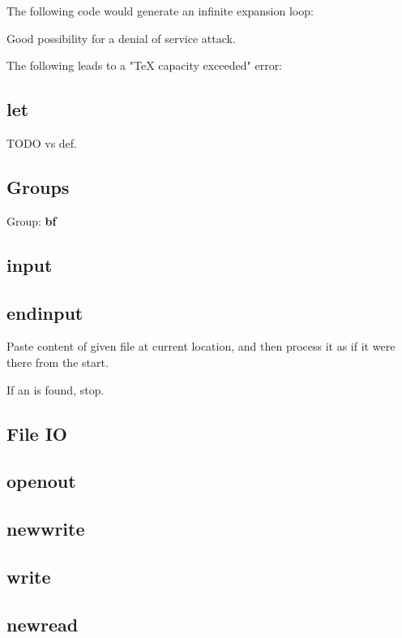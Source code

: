       The following code would generate an infinite expansion loop: %

      Good possibility for a denial of service attack.

      The following leads to a "TeX capacity exceeded" error: %

  \subsection{let}

    TODO vs def.

  \subsection{Groups}

    Group: {\bf bf}

  \subsection{input}

  \subsection{endinput}

    Paste content of given file at current location, and then process it as if it were there from the start.

    If an  is found, stop.

    

  \subsection{File IO}

  \subsection{openout}

  \subsection{newwrite}

  \subsection{write}

  \subsection{newread}

